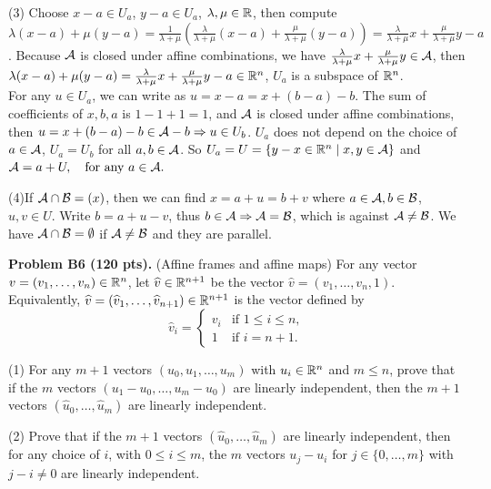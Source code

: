 \documentclass[12pt]{article}
\begin{document}
\medskip
(3)
Choose $x - a \in U_a$, $y - a \in U_a$, $\lambda, \mu \in \mathbb{R}$, then compute $\lambda (x - a) + \mu (y - a) = \frac{1}{\lambda + \mu}(\frac{\lambda}{\lambda + \mu}(x - a) + \frac{\mu}{\lambda + \mu}(y - a)) = \frac{\lambda}{\lambda + \mu} x + \frac{\mu}{\lambda + \mu} y - a$. Because ${\cal A}$ is closed under affine combinations, we have $\frac{\lambda}{\lambda + \mu} x + \frac{\mu}{\lambda + \mu} y \in {\cal A}$, then $\lambda (x - a) + \mu (y - a) = \frac{\lambda}{\lambda + \mu} x + \frac{\mu}{\lambda + \mu} y - a \in \mathbb{R}^n$, $U_a$ is a subspace of $\mathbb{R}^n$.\\
For any $u \in U_a$, we can write as $u = x - a = x + (b - a) - b$. The sum of coefficients of $x, b, a$ is $1 -1 + 1 = 1$, and ${\cal A}$ is closed under affine combinations, then $u = x + (b -a)-b \in {\cal A} - b \Rightarrow u \in U_b$. $U_a$ does not depend on the choice of $a \in {\cal A}$, $U_a = U_b$ for all $a, b\in {\cal A}$.
So $U_a = U = \{y - x \in \mathbb{R}^n \mid x, y \in {\cal A}\}$ and
$
{\cal A} = a + U, \quad\hbox{for any $a\in {\cal A}$}.
$

\medskip
(4)If ${\cal A}\cap {\cal B} = (x)$, then we can find $x = a + u = b + v$ where $a \in {\cal A}, b \in {\cal B}$, $u, v \in U$. Write $b = a + u - v$, thus $b \in {\cal A} \Rightarrow {\cal A} = {\cal B}$, which is against ${\cal A} \neq {\cal B}$. We have ${\cal A} \cap {\cal B} = \emptyset$ if ${\cal A} \neq {\cal B}$ and they are parallel. 

\vspace {0.25cm}\noindent
{\bf Problem B6 (120 pts).} (Affine frames and affine maps)
For any vector $v = (v_1, \ldots, v_n) \in \mathbb{R}^n$, let 
$\widehat{v}\in \mathbb{R}^{n+1}$ be the vector 
$\widehat{v} = (v_1, \ldots, v_n,1)$. 
Equivalently, 
$\widehat{v} = (\widehat{v}_1, \ldots, \widehat{v}_{n+1})\in \mathbb{R}^{n+1}$
is the vector defined by
\[
\widehat{v}_i=
\begin{cases}
v_i & \text{if $1\leq i \leq n$}, \\
1 & \text{if $i = n + 1$}.
\end{cases}
\]

(1)
For any $m + 1$ vectors $(u_0, u_1, \ldots, u_{m })$ 
with $u_i \in \mathbb{R}^n$  and  $m \leq n$, prove that
if the $m$ vectors $(u_1 - u_0, \ldots, u_m - u_0)$ are linearly
independent, then the $m + 1$ vectors
$(\widehat{u}_0, \ldots,  \widehat{u}_m)$ are linearly independent.

\medskip
(2) Prove that if  the $m + 1$ vectors
$(\widehat{u}_0,  \ldots,  \widehat{u}_m)$ are linearly independent,
then
for any choice of $i$, with $0 \leq i \leq m$, the
$m$ vectors $u_j - u_i$  for $j \in \{0, \ldots, m\}$ with $j - i \not = 0$
are linearly independent.
\end{document}
